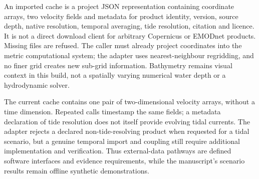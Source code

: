 An imported cache is a project JSON representation containing coordinate arrays, two velocity fields and metadata for product identity, version, source depth, native resolution, temporal averaging, tide resolution, citation and licence. It is not a direct download client for arbitrary Copernicus or EMODnet products. Missing files are refused. The caller must already project coordinates into the metric computational system; the adapter uses nearest-neighbour regridding, and no finer grid creates new sub-grid information. Bathymetry remains visual context in this build, not a spatially varying numerical water depth or a hydrodynamic solver.

The current cache contains one pair of two-dimensional velocity arrays, without a time dimension. Repeated calls timestamp the same fields; a metadata declaration of tide resolution does not itself provide evolving tidal currents. The adapter rejects a declared non-tide-resolving product when requested for a tidal scenario, but a genuine temporal import and coupling still require additional implementation and verification. Thus external-data pathways are defined software interfaces and evidence requirements, while the manuscript's scenario results remain offline synthetic demonstrations.
